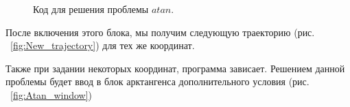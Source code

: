 \documentclass[12pt,a4paper,openany]{extarticle}
\begin{document}
\begin{enumerate}
 \begin{figure}[h!]
    \caption{Код для решения проблемы $atan$.}
	\label{fig:Pi_mod}
\end{figure} 

После включения этого блока, мы получим следующую траекторию (рис. ~\ref{fig:New_trajectory}) для тех же координат.

Также при задании некоторых координат, программа зависает. Решением данной проблемы будет ввод в блок арктангенса дополнительного условия (рис. ~\ref{fig:Atan_window})


\end{enumerate}
\end{document}
